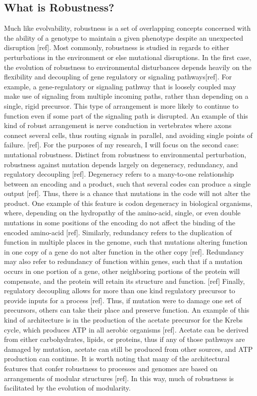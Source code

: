 \subsection{What is Robustness? }

Much like evolvability, robustness is a set of overlapping concepts concerned with the ability of a genotype to maintain a given phenotype despite an unexpected disruption [ref].  Most commonly, robustness is studied in regards to either perturbations in the environment or else mutational disruptions. In the first case, the evolution of robustness to environmental disturbances depends heavily on the flexibility and decoupling of gene regulatory or signaling pathways[ref]. For example, a gene-regulatory or signaling pathway that is loosely coupled may make use of signaling from multiple incoming paths, rather than depending on a single, rigid precursor. This type of arrangement is more likely to continue to function even if some part of the signaling path is disrupted. An example of this kind of robust arrangement is nerve conduction in vertebrates where axons connect several cells, thus routing signals in parallel, and avoiding single points of failure. [ref].
For the purposes of my research, I will focus on the second case: mutational robustness. Distinct from robustness to environmental perturbation, robustness against mutation depends largely on degeneracy, redundancy, and regulatory decoupling [ref]. Degeneracy refers to a many-to-one relationship between an encoding and a product, such that several codes can produce a single output [ref]. Thus, there is a chance that mutations in the code will not alter the product. One example of this feature is codon degeneracy in biological organisms, where, depending on the hydropathy of the amino-acid, single, or even double mutations in some positions of the encoding do not affect the binding of the encoded amino-acid [ref].
Similarly, redundancy refers to the duplication of function in multiple places in the genome, such that mutations altering function in one copy of a gene do not alter function in the other copy [ref]. Redundancy may also refer to redundancy of function within genes, such that if a mutation occurs in one portion of a gene, other neighboring portions of the protein will compensate, and the protein will retain its structure and function. [ref]
Finally, regulatory decoupling allows for more than one kind regulatory precursor to provide inputs for a process [ref]. Thus, if mutation were to damage one set of precursors, others can take their place and preserve function. An example of this kind of architecture is in the production of the acetate precursor for the Krebs cycle, which produces ATP in all aerobic organisms [ref]. Acetate can be derived from either carbohydrates, lipids, or proteins, thus if any of those pathways are damaged by mutation, acetate can still be produced from other sources, and ATP production can continue.
It is worth noting that many of the architectural features that confer robustness to processes and genomes are based on arrangements of modular structures [ref]. In this way, much of robustness is facilitated by the evolution of modularity.

